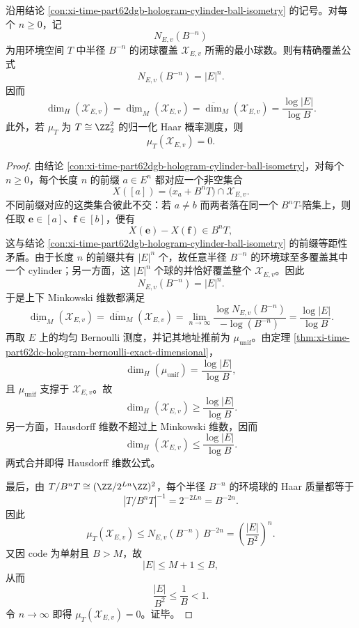 \begin{conclusion}\label{con:xi-time-part62dgb-hologram-exact-dimension-zero-haar}
沿用结论 \ref{con:xi-time-part62dgb-hologram-cylinder-ball-isometry} 的记号。对每个 \(n\ge 0\)，记
\[
N_{E,v}(B^{-n})
\]
为用环境空间 \(T\) 中半径 \(B^{-n}\) 的闭球覆盖 \(\mathcal X_{E,v}\) 所需的最小球数。则有精确覆盖公式
\[
N_{E,v}(B^{-n})=|E|^n.
\]
因而
\[
\dim_H(\mathcal X_{E,v})
=
\underline{\dim}_M(\mathcal X_{E,v})
=
\overline{\dim}_M(\mathcal X_{E,v})
=
\frac{\log |E|}{\log B}.
\]
此外，若 \(\mu_T\) 为 \(T\cong \ZZ_2^2\) 的归一化 Haar 概率测度，则
\[
\mu_T(\mathcal X_{E,v})=0.
\]
\end{conclusion}
\begin{proof}
由结论 \ref{con:xi-time-part62dgb-hologram-cylinder-ball-isometry}，对每个 \(n\ge 0\)，每个长度 \(n\) 的前缀 \(a\in E^n\) 都对应一个非空集合
\[
X([a])=\bigl(x_a+B^nT\bigr)\cap \mathcal X_{E,v}.
\]
不同前缀对应的这类集合彼此不交：若 \(a\neq b\) 而两者落在同一个 \(B^nT\)-陪集上，则任取 \(\mathbf e\in[a]\)、\(\mathbf f\in[b]\)，便有
\[
X(\mathbf e)-X(\mathbf f)\in B^nT,
\]
这与结论 \ref{con:xi-time-part62dgb-hologram-cylinder-ball-isometry} 的前缀等距性矛盾。由于长度 \(n\) 的前缀共有 \(|E|^n\) 个，故任意半径 \(B^{-n}\) 的环境球至多覆盖其中一个 cylinder；另一方面，这 \(|E|^n\) 个球的并恰好覆盖整个 \(\mathcal X_{E,v}\)。因此
\[
N_{E,v}(B^{-n})=|E|^n.
\]
于是上下 Minkowski 维数都满足
\[
\underline{\dim}_M(\mathcal X_{E,v})
=
\overline{\dim}_M(\mathcal X_{E,v})
=
\lim_{n\to\infty}\frac{\log N_{E,v}(B^{-n})}{-\log(B^{-n})}
=
\frac{\log|E|}{\log B}.
\]
再取 \(E\) 上的均匀 Bernoulli 测度，并记其地址推前为 \(\mu_{\mathrm{unif}}\)。由定理 \ref{thm:xi-time-part62dc-hologram-bernoulli-exact-dimensional}，
\[
\dim_H(\mu_{\mathrm{unif}})=\frac{\log|E|}{\log B},
\]
且 \(\mu_{\mathrm{unif}}\) 支撑于 \(\mathcal X_{E,v}\)。故
\[
\dim_H(\mathcal X_{E,v})\ge \frac{\log|E|}{\log B}.
\]
另一方面，Hausdorff 维数不超过上 Minkowski 维数，因而
\[
\dim_H(\mathcal X_{E,v})\le \frac{\log|E|}{\log B}.
\]
两式合并即得 Hausdorff 维数公式。
\par
最后，由 \(T/B^nT\cong (\ZZ/2^{Ln}\ZZ)^2\)，每个半径 \(B^{-n}\) 的环境球的 Haar 质量都等于
\[
|T/B^nT|^{-1}=2^{-2Ln}=B^{-2n}.
\]
因此
\[
\mu_T(\mathcal X_{E,v})
\le
N_{E,v}(B^{-n})\,B^{-2n}
=
\left(\frac{|E|}{B^2}\right)^n.
\]
又因 \(\mathrm{code}\) 为单射且 \(B>M\)，故
\[
|E|\le M+1\le B,
\]
从而
\[
\frac{|E|}{B^2}\le \frac{1}{B}<1.
\]
令 \(n\to\infty\) 即得 \(\mu_T(\mathcal X_{E,v})=0\)。证毕。
\end{proof}

